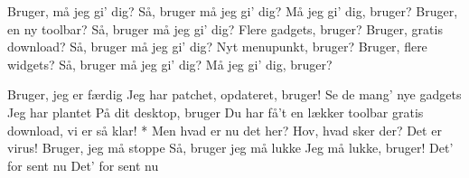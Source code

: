 \documentclass[a4paper,11pt]{article}
\begin{document}
\begin{song}
Bruger, må jeg gi' dig?
Så, bruger må jeg gi' dig?
Må jeg gi' dig, bruger?
Bruger, en ny toolbar?
Så, bruger må jeg gi' dig?
Flere gadgets, bruger?
Bruger, gratis download?
Så, bruger må jeg gi' dig?
Nyt menupunkt, bruger?
Bruger, flere widgets?
Så, bruger må jeg gi' dig?
Må jeg gi' dig, bruger?

Bruger, jeg er færdig
Jeg har patchet, opdateret, bruger!
Se de mang' nye gadgets
Jeg har plantet
På dit desktop, bruger
Du har få't en lækker toolbar
gratis download, vi er så klar! *
Men hvad er nu det her?
Hov, hvad sker der?
Det er virus!
Bruger, jeg må stoppe
Så, bruger jeg må lukke
Jeg må lukke, bruger!
Det' for sent nu
Det' for sent nu
\end{song}

\end{document}
